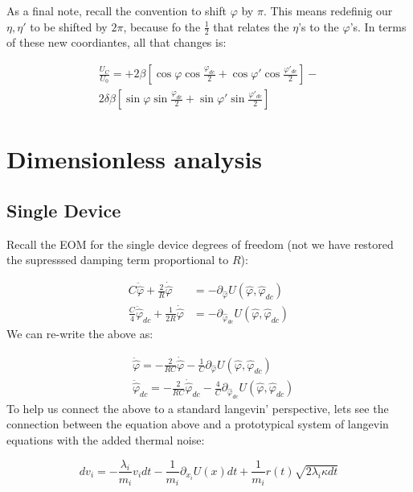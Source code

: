 \documentclass[paper=a4, twocolumn, fontsize=10pt]{article} %
\numberwithin{equation}{section} %
\numberwithin{figure}{section} %
\numberwithin{table}{section} %
\def \df#1{\hat{#1}}
\def \dl#1{#1}
\begin{document}
As a final note, recall the convention to shift $\dl\varphi$ by $\pi$. This means redefinig our $\dl\eta,\dl\eta'$ to be shifted by $2\pi$, because fo the $\frac{1}{2}$ that relates the $\dl\eta$'s to the $\dl\varphi$'s. In terms of these new coordiantes, all that changes is:

\begin{multline}
    \frac{U_C}{U_0} = +2\beta \left[ \cos\dl\varphi\cos\frac{\dl\varphi_{dc}}{2} + \cos\dl\varphi'\cos\frac{\dl\varphi'_{dc}}{2} \right] - \\
    2\delta\beta \left[ \sin\dl\varphi\sin\frac{\dl\varphi_{dc}}{2} + \sin\dl\varphi'\sin\frac{\dl\varphi'_{dc}}{2} \right]
\end{multline}



\section{Dimensionless analysis}

\subsection{Single Device}

Recall the EOM for the single device degrees of freedom (not we have restored the supresssed damping term proportional to $R$):

\begin{align}
    C \ddot{\df\varphi} + \frac{2}{R} \dot{\df\varphi} &= - \partial_{\df\varphi} U(\df\varphi, \df\varphi_{dc})
    \\
    \frac{C}{4} \ddot{\df\varphi}_{dc} + \frac{1}{2R} \dot{\df\varphi} &= - \partial_{\df\varphi_{dc}} U(\df\varphi, \df\varphi_{dc})
    \end{align}
We can re-write the above as:

\begin{align}
    &\ddot{\df\varphi} = -\frac{2}{RC} \dot{\df\varphi} -\frac{1}{C} \partial_{\df\varphi} U(\df\varphi, \df\varphi_{dc})
    \\
    &\ddot{\df\varphi}_{dc} = -\frac{2}{RC} \dot{\df\varphi}_{dc} - \frac{4}{C}\partial_{\df\varphi_{dc}} U(\df\varphi, \df\varphi_{dc})
    \end{align}
To help us connect the above to a standard langevin' perspective, lets see the connection between the equation above and a prototypical system of langevin equations with the added thermal noise:

\[ dv_i = -\frac{\lambda_i}{m_i} v_i dt - \frac{1}{m_i} \partial_{x_i} U(x) dt + \frac{1}{m_i} r(t)\sqrt{2\lambda_i \kappa dt} \]
\end{document}
